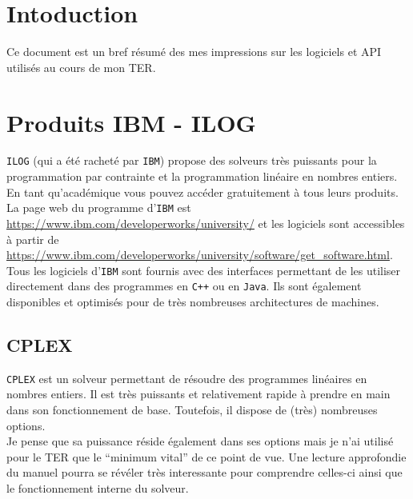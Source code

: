 \section{Intoduction}
Ce document est un bref résumé des mes impressions sur les logiciels
et API utilisés au cours de mon TER.\\


\section{Produits IBM - ILOG}
\verb?ILOG? (qui a été racheté par \verb?IBM?) propose des solveurs
très puissants pour la programmation par contrainte et
la programmation linéaire en nombres entiers.\\
En tant qu'académique vous pouvez accéder gratuitement à tous leurs produits.
La page web du programme d'\verb?IBM? est \url{https://www.ibm.com/developerworks/university/}
et les logiciels sont accessibles à partir de
\url{https://www.ibm.com/developerworks/university/software/get_software.html}.\\

Tous les logiciels d'\verb?IBM? sont fournis avec des interfaces permettant de les
utiliser directement dans des programmes en \verb?C++? ou en \verb?Java?.
Ils sont également disponibles et optimisés pour de très nombreuses architectures de machines.

\subsection{CPLEX}
\verb?CPLEX? est un solveur permettant de résoudre des programmes linéaires en nombres entiers.
Il est très puissants et relativement rapide à prendre en main dans son fonctionnement de base.
Toutefois, il dispose de (très) nombreuses options.\\
Je pense que sa puissance réside
également dans ses options mais je n'ai utilisé pour le TER que le ``minimum vital'' de ce point de vue.
Une lecture approfondie du manuel pourra se révéler très interessante pour comprendre celles-ci
ainsi que le fonctionnement interne du solveur.\\

